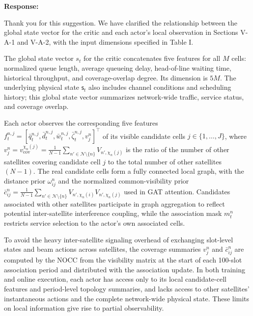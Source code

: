 \documentclass[11pt,a4paper]{article}
\begin{document}
\textbf{Response:}\par

Thank you for this suggestion. We have clarified the relationship between the global state vector for the critic and each actor's local observation in Sections V-A-1 and V-A-2, with the input dimensions specified in Table I.
\par

The global state vector $s_t$ for the critic concatenates five features for all $M$ cells: normalized queue length, average queueing delay, head-of-line waiting time, historical throughput, and coverage-overlap degree. Its dimension is $5M$. The underlying physical state $\mathsf{s}_t$ also includes channel conditions and scheduling history; this global state vector summarizes network-wide traffic, service status, and coverage overlap.
\par

Each actor observes the corresponding five features $f_t^{n,j}=[\bar q_t^{n,j},\bar d_t^{n,j},\bar w_t^{n,j},\bar\zeta_t^{n,j},v_j^n]^\top$ of its visible candidate cells $j\in\{1,\ldots,J\}$, where $v_j^n=v_{\mathrm{cov}}^{\chi_n(j)}=\frac{1}{N-1}\sum_{n'\in\mathcal N\setminus\{n\}}V_{n',\chi_n(j)}$ is the ratio of the number of other satellites covering candidate cell $j$ to the total number of other satellites $(N-1)$. The real candidate cells form a fully connected local graph, with the distance prior $\omega_{ij}^n$ and the normalized common-visibility prior $\bar c_{ij}^n=\frac{1}{N-1}\sum_{n'\in\mathcal N\setminus\{n\}}V_{n',\chi_n(i)}V_{n',\chi_n(j)}$ used in GAT attention. Candidates associated with other satellites participate in graph aggregation to reflect potential inter-satellite interference coupling, while the association mask $m_t^n$ restricts service selection to the actor's own associated cells.
\par

To avoid the heavy inter-satellite signaling overhead of exchanging slot-level states and beam actions across satellites, the coverage summaries $v_j^n$ and $\bar c_{ij}^n$ are computed by the NOCC from the visibility matrix at the start of each 100-slot association period and distributed with the association update. In both training and online execution, each actor has access only to its local candidate-cell features and period-level topology summaries, and lacks access to other satellites' instantaneous actions and the complete network-wide physical state. These limits on local information give rise to partial observability.
\par
\end{document}
